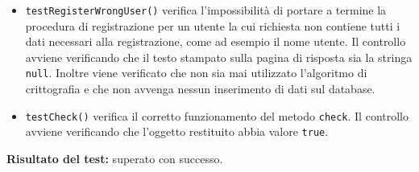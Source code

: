 \begin{itemize}
\begin{itemize}
\item \texttt{testRegisterWrongUser()} 
verifica l'impossibilità di portare a termine la procedura di registrazione per un utente la cui richiesta non contiene tutti i dati necessari alla registrazione, come ad esempio il nome utente. Il controllo avviene verificando che il testo stampato sulla pagina di risposta sia la stringa \texttt{null}. Inoltre viene verificato che non sia mai utilizzato l'algoritmo di crittografia e che non avvenga nessun inserimento di dati sul database.

\item \texttt{testCheck()} verifica il corretto funzionamento del metodo \texttt{check}. Il controllo avviene verificando che l'oggetto restituito abbia valore \texttt{true}.
 
\end{itemize}

\textbf{Risultato del test:} superato con successo.

\end{itemize}


